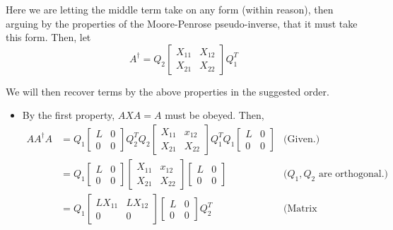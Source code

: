 \begin{solution}

    Here we are letting the middle term take on any form (within reason), then arguing by the properties of the Moore-Penrose pseudo-inverse, that it must take this form. Then, let 
    \[
    A^\dag = Q_2\begin{bmatrix}X_{11} &X_{12} \\ X_{21} &X_{22}\end{bmatrix}Q_1^T
    \]

    We will then recover terms by the above properties in the suggested order.
    \begin{itemize}
        \item By the first property, $AXA = A$ must be obeyed. Then, 
        \vspace{-5mm}
        \alignbreak
        \vspace{-5mm}
        \begin{align}
            AA^\dag A &= Q_1\begin{bmatrix}L &0\\0&0\end{bmatrix}Q_2^TQ_2\begin{bmatrix}X_{11} &x_{12}\\X_{21} &X_{22}\end{bmatrix}Q_1^TQ_1\begin{bmatrix}L &0\\0&0\end{bmatrix} &\text{(Given.)}\nonumber\\
            &=  Q_1\begin{bmatrix}L &0\\0&0\end{bmatrix}\begin{bmatrix}X_{11} &x_{12}\\X_{21} &X_{22}\end{bmatrix}\begin{bmatrix}L &0\\0&0\end{bmatrix} &\text{($Q_1, Q_2$ are orthogonal.)}\nonumber\\
            &= Q_1 \begin{bmatrix}LX_{11} &LX_{12}\\ 0&0\end{bmatrix}\begin{bmatrix}L &0\\0&0\end{bmatrix}Q_2^T &\text{(Matrix multiplication.)}\nonumber\\

\end{align}
\end{itemize}
\end{solution}

